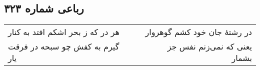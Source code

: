 \begin{center}
\section*{رباعی شماره ۳۲۳}
\label{sec:sh323}
\begin{longtable}{l p{0.5cm} r}
هر در که ز بحر اشکم افتد به کنار
&&
در رشتهٔ جان خود کشم گوهروار
\\
گیرم به کفش چو سبحه در فرقت یار
&&
یعنی که نمی‌زنم نفس جز بشمار
\\
\end{longtable}
\end{center}
